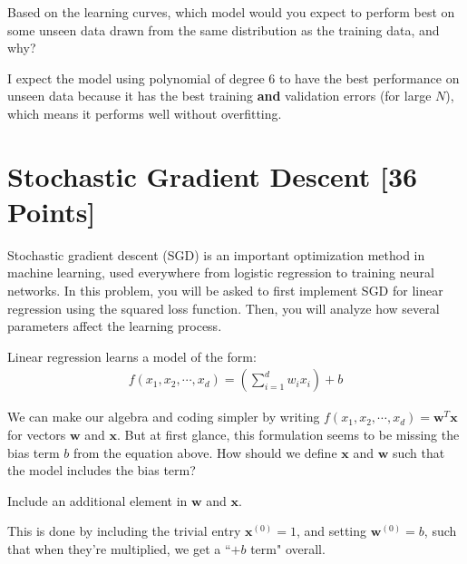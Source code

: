 \documentclass{article}
\begin{document}
\begin{problem}[3]
  Based on the learning curves, which model would you expect to perform best on some unseen data drawn from the same distribution as the training data, and why?
\end{problem}
\begin{solution}
  I expect the model using polynomial of degree 6 to have the best performance on unseen data because it has the best training \textbf{and} validation errors (for large $N$), which means it performs well without overfitting.
\end{solution}





\newpage
\section{Stochastic Gradient Descent [36 Points]}

Stochastic gradient descent (SGD) is an important optimization method in machine learning, used everywhere from logistic regression to training neural networks. In this problem, you will be asked to first implement SGD for linear regression using the squared loss function. Then, you will analyze how several parameters affect the learning process.

Linear regression learns a model of the form:
\begin{align*}
  f(x_1, x_2, \cdots, x_d) = \left(\sum_{i=1}^d w_i x_i\right) + b
\end{align*}

\begin{problem}[2]
  We can make our algebra and coding simpler by writing $f(x_1, x_2, \cdots, x_d) = \mathbf{w}^T\mathbf{x}$ for vectors $\mathbf{w}$ and $\mathbf{x}$.  But at first glance, this formulation seems to be missing the bias term $b$ from the equation above.  How should we define $\mathbf{x}$ and $\mathbf{w}$ such that the model includes the bias term?
\end{problem}
\begin{hint}
  Include an additional element in $\mathbf{w}$ and $\mathbf{x}$.
\end{hint}
\begin{solution}
  This is done by including the trivial entry $\mathbf{x}^{(0)} = 1$, and setting $\mathbf{w}^{(0)}=b$, such that when they're multiplied, we get a ``$+b$ term" overall.
\end{solution}
\end{document}

